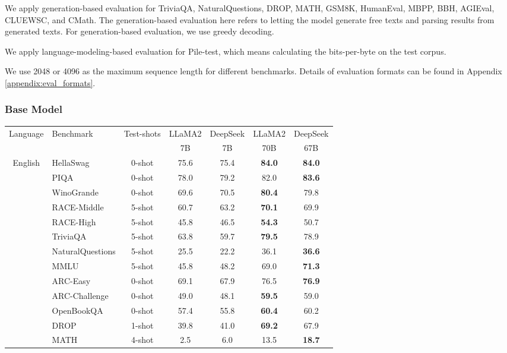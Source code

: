 \documentclass[11pt, a4paper, logo, copyright, nonumbering]{deepseek}
\begin{document}
\begin{CJK*}{UTF8}{gbsn}
We apply generation-based evaluation for TriviaQA, NaturalQuestions, DROP, MATH, GSM8K, HumanEval, MBPP, BBH, AGIEval, CLUEWSC, and CMath. The generation-based evaluation here refers to letting the model generate free texts and parsing results from generated texts. For generation-based evaluation, we use greedy decoding.

We apply language-modeling-based evaluation for Pile-test, which means calculating the bits-per-byte on the test corpus.

We use 2048 or 4096 as the maximum sequence length for different benchmarks. Details of evaluation formats can be found in Appendix \ref{appendix:eval_formats}.


\subsubsection{Base Model}
\begin{table}[!t]
    \centering
\begin{tabular}{clc|cccc}
\toprule
 \multirow{2}{*}{Language} & \multirow{2}{*}{\centering Benchmark} & \multirow{2}{*}{Test-shots} & LLaMA2 & DeepSeek & LLaMA2 & DeepSeek \\
 & & & 7B & 7B & 70B & 67B \\
\midrule
\multirow{19}{*}{English} & HellaSwag & 0-shot & 75.6 & 75.4 & \textbf{84.0} & \textbf{84.0} \\
&PIQA & 0-shot & 78.0 & 79.2 & 82.0 & \textbf{83.6} \\
&WinoGrande & 0-shot & 69.6 & 70.5 & \textbf{80.4} & 79.8 \\
&RACE-Middle & 5-shot & 60.7 & 63.2 & \textbf{70.1} & 69.9 \\
&RACE-High & 5-shot & 45.8 & 46.5 & \textbf{54.3} & 50.7 \\
&TriviaQA & 5-shot & 63.8 & 59.7 & \textbf{79.5} & 78.9 \\
&NaturalQuestions & 5-shot & 25.5 & 22.2 & 36.1 & \textbf{36.6} \\
&MMLU & 5-shot & 45.8 & 48.2 & 69.0 & \textbf{71.3} \\
&ARC-Easy & 0-shot & 69.1 & 67.9 & 76.5 & \textbf{76.9} \\
&ARC-Challenge & 0-shot & 49.0 & 48.1 & \textbf{59.5} & 59.0 \\
&OpenBookQA  & 0-shot & 57.4 & 55.8 & \textbf{60.4} & 60.2 \\
&DROP & 1-shot & 39.8 & 41.0 & \textbf{69.2} & 67.9 \\
&MATH & 4-shot & 2.5 & 6.0 & 13.5 & \textbf{18.7} \\

\end{tabular}
\end{table}
\end{CJK*}
\end{document}
